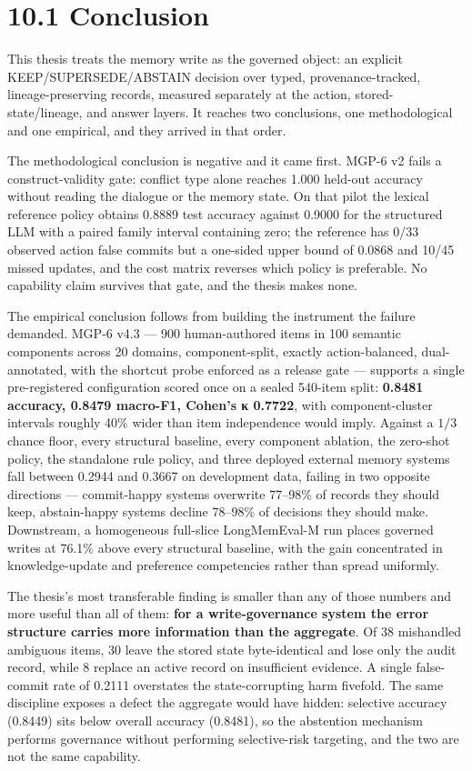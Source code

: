 \section{10.1 Conclusion}\label{conclusion}

This thesis treats the memory write as the governed object: an explicit
KEEP/SUPERSEDE/ABSTAIN decision over typed, provenance-tracked,
lineage-preserving records, measured separately at the action,
stored-state/lineage, and answer layers. It reaches two conclusions, one
methodological and one empirical, and they arrived in that order.

The methodological conclusion is negative and it came first. MGP-6 v2
fails a construct-validity gate: conflict type alone reaches 1.000
held-out accuracy without reading the dialogue or the memory state. On
that pilot the lexical reference policy obtains 0.8889 test accuracy
against 0.9000 for the structured LLM with a paired family interval
containing zero; the reference has 0/33 observed action false commits
but a one-sided upper bound of 0.0868 and 10/45 missed updates, and the
cost matrix reverses which policy is preferable. No capability claim
survives that gate, and the thesis makes none.

The empirical conclusion follows from building the instrument the
failure demanded. MGP-6 v4.3 --- 900 human-authored items in 100
semantic components across 20 domains, component-split, exactly
action-balanced, dual-annotated, with the shortcut probe enforced as a
release gate --- supports a single pre-registered configuration scored
once on a sealed 540-item split: \textbf{0.8481 accuracy, 0.8479
macro-F1, Cohen's κ 0.7722}, with component-cluster intervals roughly
40\% wider than item independence would imply. Against a \(1/3\) chance
floor, every structural baseline, every component ablation, the
zero-shot policy, the standalone rule policy, and three deployed
external memory systems fall between 0.2944 and 0.3667 on development
data, failing in two opposite directions --- commit-happy systems
overwrite 77--98\% of records they should keep, abstain-happy systems
decline 78--98\% of decisions they should make. Downstream, a
homogeneous full-slice LongMemEval-M run places governed writes at
76.1\% above every structural baseline, with the gain concentrated in
knowledge-update and preference competencies rather than spread
uniformly.

The thesis's most transferable finding is smaller than any of those
numbers and more useful than all of them: \textbf{for a write-governance
system the error structure carries more information than the aggregate}.
Of 38 mishandled ambiguous items, 30 leave the stored state
byte-identical and lose only the audit record, while 8 replace an active
record on insufficient evidence. A single false-commit rate of 0.2111
overstates the state-corrupting harm fivefold. The same discipline
exposes a defect the aggregate would have hidden: selective accuracy
(0.8449) sits below overall accuracy (0.8481), so the abstention
mechanism performs governance without performing selective-risk
targeting, and the two are not the same capability.

